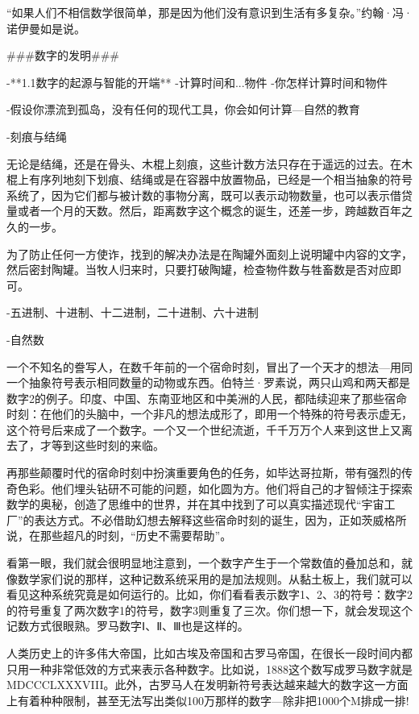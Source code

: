 “如果人们不相信数学很简单，那是因为他们没有意识到生活有多复杂。”约翰·冯·诺伊曼如是说。


###数字的发明###

-**1.1数字的起源与智能的开端**
-计算时间和...物件
-你怎样计算时间和物件

-假设你漂流到孤岛，没有任何的现代工具，你会如何计算---自然的教育

-刻痕与结绳

无论是结绳，还是在骨头、木棍上刻痕，这些计数方法只存在于遥远的过去。在木棍上有序列地刻下划痕、结绳或是在容器中放置物品，已经是一个相当抽象的符号系统了，因为它们都与被计数的事物分离，既可以表示动物数量，也可以表示借贷量或者一个月的天数。然后，距离数字这个概念的诞生，还差一步，跨越数百年之久的一步。

为了防止任何一方使诈，找到的解决办法是在陶罐外面刻上说明罐中内容的文字，然后密封陶罐。当牧人归来时，只要打破陶罐，检查物件数与牲畜数是否对应即可。


-五进制、十进制、十二进制，二十进制、六十进制


-自然数

一个不知名的誊写人，在数千年前的一个宿命时刻，冒出了一个天才的想法---用同一个抽象符号表示相同数量的动物或东西。伯特兰·罗素说，两只山鸡和两天都是数字2的例子。印度、中国、东南亚地区和中美洲的人民，都陆续迎来了那些宿命时刻：在他们的头脑中，一个非凡的想法成形了，即用一个特殊的符号表示虚无，这个符号后来成了一个数字。一个又一个世纪流逝，千千万万个人来到这世上又离去了，才等到这些时刻的来临。

再那些颠覆时代的宿命时刻中扮演重要角色的任务，如毕达哥拉斯，带有强烈的传奇色彩。他们埋头钻研不可能的问题，如化圆为方。他们将自己的才智倾注于探索数学的奥秘，创造了思维中的世界，并在其中找到了可以真实描述现代“宇宙工厂”的表达方式。不必借助幻想去解释这些宿命时刻的诞生，因为，正如茨威格所说，在那些超凡的时刻，“历史不需要帮助”。



看第一眼，我们就会很明显地注意到，一个数字产生于一个常数值的叠加总和，就像数学家们说的那样，这种记数系统采用的是加法规则。从黏土板上，我们就可以看见这种系统究竟是如何运行的。比如，你们看看表示数字1、2、3的符号：数字2的符号重复了两次数字1的符号，数字3则重复了三次。你们想一下，就会发现这个记数方式很眼熟。罗马数字Ⅰ、Ⅱ、Ⅲ也是这样的。

人类历史上的许多伟大帝国，比如古埃及帝国和古罗马帝国，在很长一段时间内都只用一种非常低效的方式来表示各种数字。比如说，1888这个数写成罗马数字就是MDCCCLXXXVIII。此外，古罗马人在发明新符号表达越来越大的数字这一方面上有着种种限制，甚至无法写出类似100万那样的数字---除非把1000个M排成一排!

